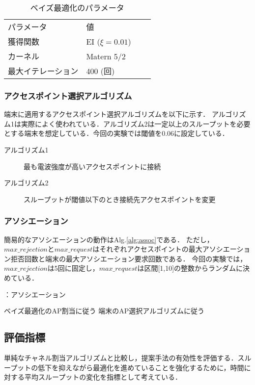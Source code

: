 \documentclass[a4paper,11pt]{jarticle}
\begin{document}
\begin{table}[H]
\centering
\caption{ベイズ最適化のパラメータ}
\begin{tabular}{l|lll}
パラメータ & 値 &  &  \\ \cline{1-2}
獲得関数 & EI ($\xi=0.01$)&  &  \\
カーネル & Matern 5/2 &  &  \\
最大イテレーション & 400 (回) &  & \\
\end{tabular}
\label{bayes_parameter}
\end{table}

\subsubsection{アクセスポイント選択アルゴリズム}
端末に適用するアクセスポイント選択アルゴリズムを以下に示す．
アルゴリズム1は実際によく使われている．アルゴリズム2は一定以上のスループットを必要とする端末を想定している．今回の実験では閾値を0.06に設定している．

\begin{description}
  \item[アルゴリズム1]最も電波強度が高いアクセスポイントに接続
  \item[アルゴリズム2]スループットが閾値以下のとき接続先アクセスポイントを変更
\end{description}

\subsubsection{アソシエーション}
簡易的なアソシエーションの動作はAlg.\ref{alg:assoc}である．
ただし，$max\_rejection$と$max\_request$はそれぞれアクセスポイントの最大アソシエーション拒否回数と端末の最大アソシエーション要求回数である．
今回の実験では，$max\_rejection$は5回に固定し，$max\_request$は区間[1,10]の整数からランダムに決めている．

\begin{algorithm}[H]
  \caption{：アソシエーション}
  \label{alg:assoc}
  \begin{algorithmic}[1]
      \State ベイズ最適化のAP割当に従う
    \Else
      \State 端末のAP選択アルゴリズムに従う
    \EndIf
  \end{algorithmic}
\end{algorithm}

\subsection{評価指標}
単純なチャネル割当アルゴリズムと比較し，提案手法の有効性を評価する．スループットの低下を抑えながら最適化を進めていることを強化するために，時間に対する平均スループットの変化を指標として考えている．
\end{document}
